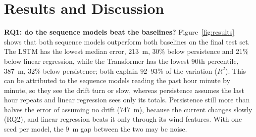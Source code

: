 \documentclass[sigconf]{acmart}
\begin{document}

\section{Results and Discussion}



\textbf{RQ1: do the sequence models beat the baselines?} Figure~\ref{fig:results} shows that both sequence models outperform both baselines on the final test set. The LSTM has the lowest median error, 213~m, 30\% below persistence and 21\% below linear regression, while the Transformer has the lowest 90th percentile, 387~m, 32\% below persistence; both explain 92--93\% of the variation ($R^2$). This can be attributed to the sequence models reading the past hour minute by minute, so they see the drift turn or slow, whereas persistence assumes the last hour repeats and linear regression sees only its totals. Persistence still more than halves the error of assuming no drift (747~m), because the current changes slowly (RQ2), and linear regression beats it only through its wind features. With one seed per model, the 9~m gap between the two may be noise.
\end{document}
